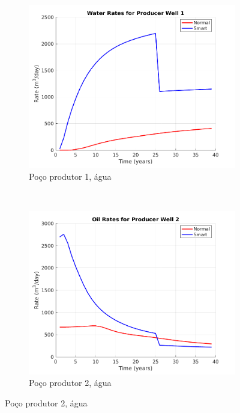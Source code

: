 \begin{figure}[!ht]
	\centering
	\begin{subfigure}[b]{.3\textwidth}
		\includegraphics[width=\textwidth]{figs/resultadosLSAIGUP/LSAIGUP_WaterWell1_Zoom}
		\caption{Po\c{c}o produtor 1, \'{a}gua}
		\label{LSAIGUP_WaterWell1}
	\end{subfigure}
	~
	\begin{subfigure}[b]{.3\textwidth}
		\includegraphics[width=\textwidth]{figs/resultadosLSAIGUP/LSAIGUP_OilWell2_Zoom}
		\caption{Po\c{c}o produtor 2, \'{a}gua}
		\label{LSAIGUP_WaterWell2}
	\end{subfigure}

\end{figure}
